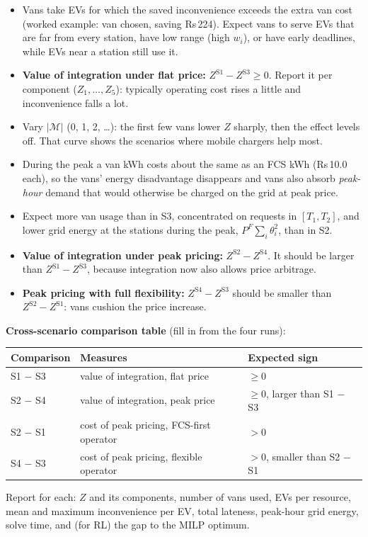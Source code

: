 \documentclass[11pt,a4paper]{article}
\newcommand{\M}{\mathcal{M}}
\begin{document}
\ifnum{}
\begin{itemize}[leftmargin=1.4em,itemsep=2pt]
  \item Vans take EVs for which the saved inconvenience exceeds the extra van cost (worked example: van chosen, saving Rs\,224). Expect vans to serve EVs that are far from every station, have low range (high $w_i$), or have early deadlines, while EVs near a station still use it.
  \item \textbf{Value of integration under flat price:} $Z^{\text{S1}}-Z^{\text{S3}}\ge0$. Report it per component ($Z_1,\dots,Z_5$): typically operating cost rises a little and inconvenience falls a lot.
  \item Vary $|\M|$ (0, 1, 2, \dots): the first few vans lower $Z$ sharply, then the effect levels off. That curve shows the scenarios where mobile chargers help most.
\end{itemize}
\fi
\ifnum{}
\begin{itemize}[leftmargin=1.4em,itemsep=2pt]
  \item During the peak a van kWh costs about the same as an FCS kWh (Rs\,10.0 each), so the vans' energy disadvantage disappears and vans also absorb \emph{peak-hour} demand that would otherwise be charged on the grid at peak price.
  \item Expect more van usage than in S3, concentrated on requests in $[T_1,T_2]$, and lower grid energy at the stations during the peak, $P^F\sum_i\theta^2_i$, than in S2.
  \item \textbf{Value of integration under peak pricing:} $Z^{\text{S2}}-Z^{\text{S4}}$. It should be larger than $Z^{\text{S1}}-Z^{\text{S3}}$, because integration now also allows price arbitrage.
  \item \textbf{Peak pricing with full flexibility:} $Z^{\text{S4}}-Z^{\text{S3}}$ should be smaller than $Z^{\text{S2}}-Z^{\text{S1}}$: vans cushion the price increase.
\end{itemize}
\fi

\textbf{Cross-scenario comparison table} (fill in from the four runs):
\begin{center}
\renewcommand{\arraystretch}{1.2}
\begin{tabular}{@{}lll@{}}
\toprule
\textbf{Comparison} & \textbf{Measures} & \textbf{Expected sign} \\
\midrule
S1 $-$ S3 & value of integration, flat price & $\ge0$ \\
S2 $-$ S4 & value of integration, peak price & $\ge0$, larger than S1 $-$ S3 \\
S2 $-$ S1 & cost of peak pricing, FCS-first operator & $>0$ \\
S4 $-$ S3 & cost of peak pricing, flexible operator & $>0$, smaller than S2 $-$ S1 \\
\bottomrule
\end{tabular}
\end{center}
Report for each: $Z$ and its components, number of vans used, EVs per resource, mean and maximum inconvenience per EV, total lateness, peak-hour grid energy, solve time, and (for RL) the gap to the MILP optimum.
\end{document}

